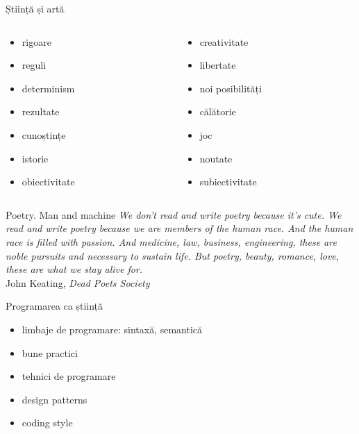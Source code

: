 \documentclass{beamer}
\begin{document}
\begin{frame}{Știință și artă}
  \begin{columns}
    \begin{column}{0.5\textwidth}
      \begin{itemize}
        \item rigoare
        \item reguli
        \item determinism
        \item rezultate
        \item cunoștințe
        \item istorie
        \item obiectivitate
      \end{itemize}
    \end{column}
    \begin{column}{0.5\textwidth}
      \begin{itemize}
        \item creativitate
        \item libertate
        \item noi posibilități
        \item călătorie
        \item joc
        \item noutate
        \item subiectivitate
      \end{itemize}
    \end{column}
  \end{columns}
\end{frame}

\begin{frame}{Poetry. Man and machine}
  \textit{We don't read and write poetry because it's cute. We read and write poetry because we are members of the human race. And the human race is filled with passion. And medicine, law, business, engineering, these are noble pursuits and necessary to sustain life. But poetry, beauty, romance, love, these are what we stay alive for.}\\
  \vspace{0.5cm}
  \hfill{John Keating, \textit{Dead Poets Society}}
\end{frame}

\begin{frame}{Programarea ca știință}
  \begin{itemize}
    \pause
    \item limbaje de programare: sintaxă, semantică
    \item bune practici
    \item tehnici de programare
    \item design patterns
    \item coding style
  \end{itemize}
\end{frame}
\end{document}
